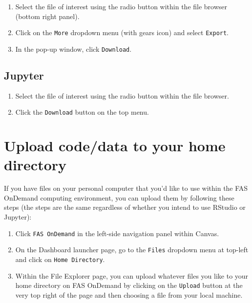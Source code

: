 \documentclass[]{book}
\providecommand{\tightlist}{%
  \setlength{\itemsep}{0pt}\setlength{\parskip}{0pt}}
\begin{document}
\begin{enumerate}
\def\labelenumi{\arabic{enumi}.}
\tightlist
\item
  Select the file of interest using the radio button within the file browser (bottom right panel).
\item
  Click on the \texttt{More} dropdown menu (with gears icon) and select \texttt{Export}.
\item
  In the pop-up window, click \texttt{Download}.
\end{enumerate}

\hypertarget{jupyter-2}{%
\section{Jupyter}\label{jupyter-2}}

\begin{enumerate}
\def\labelenumi{\arabic{enumi}.}
\tightlist
\item
  Select the file of interest using the radio button within the file browser.
\item
  Click the \texttt{Download} button on the top menu.
\end{enumerate}

\hypertarget{upload-codedata-to-your-home-directory}{%
\chapter{Upload code/data to your home directory}\label{upload-codedata-to-your-home-directory}}

If you have files on your personal computer that you'd like to use within the FAS OnDemand computing environment, you can upload them by following these steps (the steps are the same regardless of whether you intend to use RStudio or Jupyter):

\begin{enumerate}
\def\labelenumi{\arabic{enumi}.}
\tightlist
\item
  Click \texttt{FAS\ OnDemand} in the left-side navigation panel within Canvas.
\item
  On the Dashboard launcher page, go to the \texttt{Files} dropdown menu at top-left and click on \texttt{Home\ Directory}.
\item
  Within the File Explorer page, you can upload whatever files you like to your home directory on FAS OnDemand by clicking on the \texttt{Upload} button at the very top right of the page and then choosing a file from your local machine.
\end{enumerate}
\end{document}
